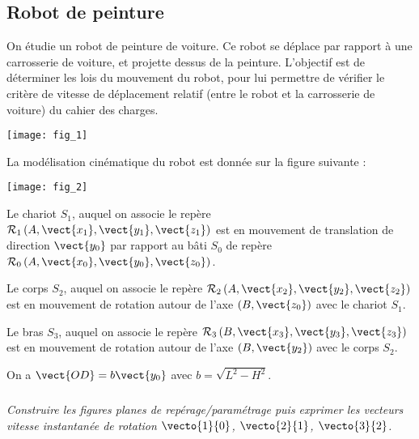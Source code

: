 \ifprof
\else
\begin{multicols}{2}
\fi


\subsection*{Robot de peinture}

\vspace{.25cm}

On étudie un robot de peinture de voiture. Ce robot se déplace par rapport à une carrosserie de voiture, et projette dessus de la peinture. L'objectif est de déterminer les lois du mouvement du robot, pour lui permettre de vérifier le critère de vitesse de déplacement relatif (entre le robot et la carrosserie de voiture) du cahier des charges.

\begin{center}
\texttt{[image: fig\_1]}

\end{center}

\vspace{.25cm}


La modélisation cinématique du robot est donnée sur la figure suivante :


\begin{center}
\texttt{[image: fig\_2]}
\end{center}



\vspace{.25cm}

Le chariot $S_1$, auquel on associe le repère $\mathcal{R}_1\left(A,\vect{x_1},\vect{y_1},\vect{z_1}\right)$ est en mouvement de translation de direction $\vect{y_0}$ par rapport au bâti $S_0$ de repère $\mathcal{R}_0\left(A,\vect{x_0},\vect{y_0},\vect{z_0}\right)$. 

Le corps $S_2$, auquel on associe le repère $\mathcal{R}_2\left(A,\vect{x_2},\vect{y_2},\vect{z_2}\right)$ est en mouvement de rotation autour de l'axe $(B,\vect{z_0})$ avec le chariot $S_1$. 

Le bras $S_3$, auquel on associe le repère $\mathcal{R}_3\left(B,\vect{x_3},\vect{y_3},\vect{z_3}\right)$ est en mouvement de rotation autour de l'axe $(B,\vect{y_2})$ avec le corps $S_2$. 

On a $\vect{OD}=b\vect{y_0}$ avec $b=\sqrt{L^2-H^2}$.




\subparagraph{}
\textit{Construire les figures planes de repérage/paramétrage puis exprimer les vecteurs vitesse instantanée de rotation $\vecto{1}{0}$, $\vecto{2}{1}$, $\vecto{3}{2}$.}


\end{multicols}
